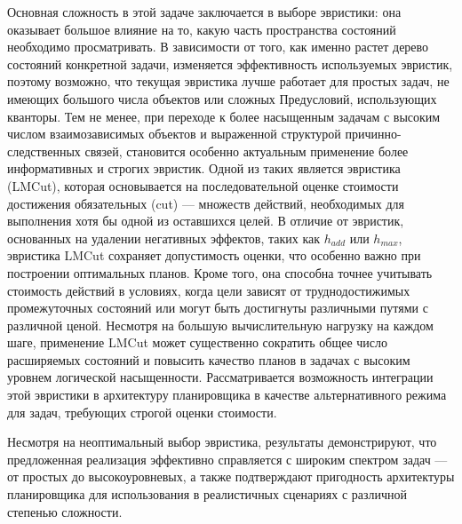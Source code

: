 Основная сложность в этой задаче заключается в выборе эвристики:
она оказывает большое влияние на то, какую часть пространства состояний необходимо
просматривать.
В зависимости от того, как именно растет дерево состояний конкретной задачи,
изменяется эффективность используемых эвристик,
поэтому возможно, что текущая эвристика лучше работает для простых задач,
не имеющих большого числа объектов или сложных Предусловий, использующих кванторы.
Тем не менее, при переходе к более насыщенным задачам с высоким числом
взаимозависимых объектов и выраженной структурой причинно-следственных связей,
становится особенно актуальным применение более информативных и строгих эвристик.
Одной из таких является эвристика ~\cite{lmcut} (LMCut),
которая основывается на последовательной оценке стоимости
достижения обязательных  (cut) --- множеств действий,
необходимых для выполнения хотя бы одной из оставшихся целей.
В отличие от эвристик, основанных на удалении негативных эффектов,
таких как $h_{add}$ или $h_{max}$,
эвристика LMCut сохраняет допустимость оценки,
что особенно важно при построении оптимальных планов.
Кроме того, она способна точнее учитывать стоимость действий
в условиях, когда цели зависят от труднодостижимых промежуточных состояний
или могут быть достигнуты различными путями с различной ценой.
Несмотря на большую вычислительную нагрузку на каждом шаге,
применение LMCut может существенно сократить общее число расширяемых состояний
и повысить качество планов в задачах с высоким уровнем логической насыщенности.
Рассматривается возможность интеграции этой эвристики в архитектуру планировщика
в качестве альтернативного режима для задач, требующих строгой оценки стоимости.

Несмотря на неоптимальный выбор эвристика,
результаты демонстрируют, что предложенная реализация
эффективно справляется с широким спектром задач ---
от простых до высокоуровневых,
а также подтверждают пригодность архитектуры планировщика
для использования в реалистичных сценариях с различной степенью сложности.
